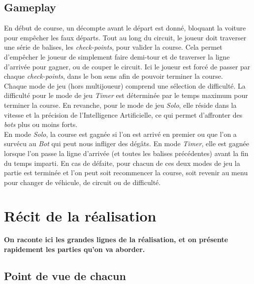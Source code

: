 \documentclass[12pt,a4paper]{article}
\newcommand{\AI}{Intelligence Artificielle}
\begin{document}
        \subsection{Gameplay}
            En début de course, un décompte avant le départ est donné, bloquant la voiture pour 
            empêcher les faux départs. Tout au long du circuit, le joueur doit traverser une série de 
            balises, les \textsl{check-points}, pour valider la course. Cela permet d'empêcher le 
            joueur de simplement faire demi-tour et de traverser la ligne d'arrivée pour gagner, ou
            de couper le circuit. Ici le joueur est forcé de passer par chaque \textsl{check-points},
            dans le bon sens afin de pouvoir terminer la course.\\
            Chaque mode de jeu (hors multijoueur) comprend une sélection de difficulté.
            La difficulté pour le mode de jeu \textsl{Timer} est déterminée par le temps maximum pour 
            terminer la course. En revanche, pour le mode de jeu \textsl{Solo}, 
            elle réside dans la vitesse et la précision de l'\AI, ce qui permet d'affronter des 
            \textsl{bots} plus
            ou moins forts. \\
            En mode \textsl{Solo}, la course est gagnée si l'on est arrivé en premier ou que l'on a 
            survécu au \textsl{Bot} qui peut nous infliger des dégâts. En mode \textsl{Timer}, elle 
            est gagnée lorsque l'on passe la ligne d'arrivée (et toutes les balises précédentes) avant
            la fin du temps imparti. En cas de défaite, pour chacun de ces deux modes de jeu la partie
            est terminée et l'on peut soit recommencer la course, soit revenir au menu pour changer de
            véhicule, de circuit ou de difficulté.\\


    \clearpage
    \section{Récit de la réalisation}
        \textbf{On raconte ici les grandes lignes de la réalisation, et on présente rapidement les 
        parties qu'on va aborder.\\}


        \subsection{Point de vue de chacun}
\end{document}
